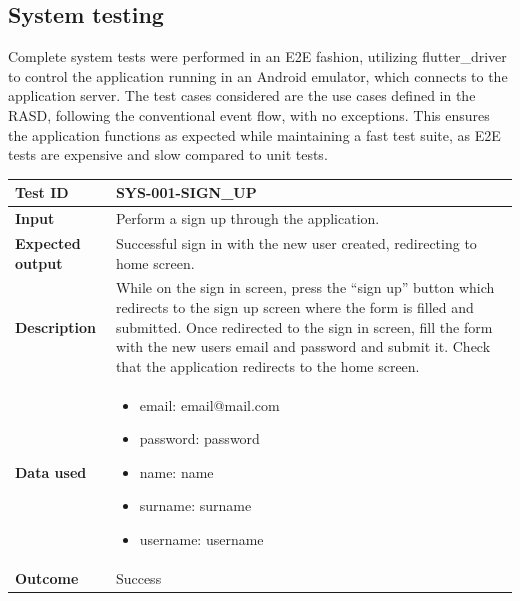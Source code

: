 \subsection{System testing}
Complete system tests were performed in an E2E fashion, utilizing flutter\_driver to control the application running in an Android emulator, which connects to the application server. The test cases considered are the use cases defined in the RASD, following the conventional event flow, with no exceptions. This ensures the application functions as expected while maintaining a fast test suite, as E2E tests are expensive and slow compared to unit tests.\\

\begin{table}[H]
    \centering
    \begin{tabular}{p{3cm}p{10cm}}
    \textbf{Test ID} & SYS-001-SIGN\_UP \\ \hline
    \textbf{Input} & Perform a sign up through the application. \\ \hline
    \textbf{Expected output} & Successful sign in with the new user created, redirecting to home screen. \\ \hline
    \textbf{Description} & While on the sign in screen, press the “sign up” button which redirects to the sign up screen where the form is filled and submitted. Once redirected to the sign in screen, fill the form with the new users email and password and submit it. Check that the application redirects to the home screen. \\ \hline
    \textbf{Data used} & 
        \begin{itemize}[label={}] \itemsep0em
            \item email: email@mail.com
            \item password: password
            \item name: name
            \item surname: surname
            \item username: username
        \end{itemize} \\ \hline
    \textbf{Outcome} & Success \\ \hline
    \end{tabular}
\end{table}

